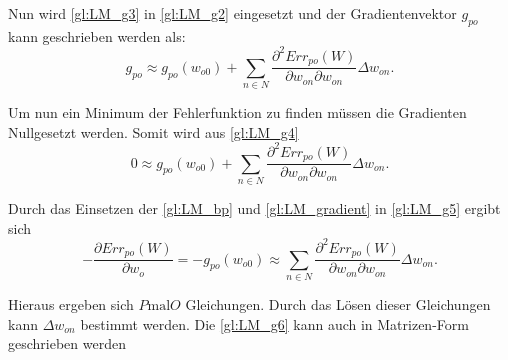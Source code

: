 Nun wird \autoref{gl:LM_g3} in \autoref{gl:LM_g2} eingesetzt und der Gradientenvektor $g_{po}$ kann geschrieben werden als:
\begin{equation}
g_{po} \approx g_{po}(w_{o0}) + \sum\limits_{n \in N} \frac{\partial^2 Err_{po}(W)}{\partial w_{on} \partial w_{on}} \Delta w_{on} .
\label{gl:LM_g4}
\end{equation}

Um nun ein Minimum der Fehlerfunktion zu finden müssen die Gradienten Nullgesetzt werden. Somit wird aus \autoref{gl:LM_g4}
\begin{equation}
0 \approx g_{po}(w_{o0}) + \sum\limits_{n \in N} \frac{\partial^2 Err_{po}(W)}{\partial w_{on} \partial w_{on}} \Delta w_{on} .
\label{gl:LM_g5}
\end{equation}

Durch das Einsetzen der \autoref{gl:LM_bp} und \autoref{gl:LM_gradient} in \autoref{gl:LM_g5} ergibt sich
\begin{equation}
-\frac{\partial Err_{po}(W)}{\partial w_{o}}  = -g_{po}(w_{o0}) \approx \sum\limits_{n \in N} \frac{\partial^2 Err_{po}(W)}{\partial w_{on} \partial w_{on}} \Delta w_{on} .
\label{gl:LM_g6}
\end{equation}

Hieraus ergeben sich $P \text{mal} O$ Gleichungen. Durch das Lösen dieser Gleichungen kann $\Delta w_{on}$ bestimmt werden. Die \autoref{gl:LM_g6} kann auch in Matrizen-Form geschrieben werden

